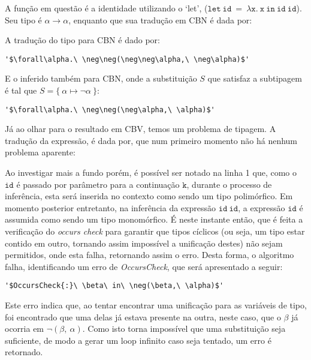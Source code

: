 A função em questão é a identidade utilizando o `let', ($\mathtt{let\ id\ =\ \lambda x.\ x\ in\ id\ id}$).
Seu tipo é $\alpha \to \alpha$, enquanto que sua tradução em CBN é dada por:

A tradução do tipo para CBN é dado por:
\lstset{extendedchars=false, escapeinside=''}
\begin{lstlisting}[style=output,caption={Tradução em CBN da identidade com `let'}]
  '$\forall\alpha.\ \neg\neg(\neg\neg\alpha,\ \neg\alpha)$'
\end{lstlisting}
E o inferido também para CBN, onde a substituição $S$ que satisfaz a subtipagem é tal que $S = \{\ \alpha \mapsto \neg\alpha \ \}$:
\lstset{extendedchars=false, escapeinside=''}
\begin{lstlisting}[style=output,caption={Inferência da identidade com `let' traduzido em CBN}]
  '$\forall\alpha.\ \neg\neg(\neg\alpha,\ \alpha)$'
\end{lstlisting}
Já ao olhar para o resultado em CBV, temos um problema de tipagem.
A tradução da expressão, é dada por, que num primeiro momento não há nenhum problema aparente:

Ao investigar mais a fundo porém, é possível ser notado na linha 1 que, como o $\mathtt{id}$ é passado por parâmetro para a continuação $\mathtt{k}$, durante o processo de inferência, esta será inserida no contexto como sendo um tipo polimórfico.
Em momento posterior entretanto, na inferência da expressão $\mathtt{id\ id}$, a expressão $\mathtt{id}$ é assumida como sendo um tipo monomórfico.
É neste instante então, que é feita a verificação do \textit{occurs check} para garantir que tipos cíclicos (ou seja, um tipo estar contido em outro, tornando assim impossível a unificação destes) não sejam permitidos, onde esta falha, retornando assim o erro.
Desta forma, o algoritmo falha, identificando um erro de \textit{OccursCheck}, que será apresentado a seguir:
\lstset{extendedchars=false, escapeinside=''}
\begin{lstlisting}[style=output,caption={Erro de Inferência da identidade com `let' traduzido em CBV}]
  '$OccursCheck{:}\ \beta\ in\ \neg(\beta,\ \alpha)$'
\end{lstlisting}
Este erro indica que, ao tentar encontrar uma unificação para as variáveis de tipo, foi encontrado que uma delas já estava presente na outra, neste caso, que o $\beta$ já ocorria em $\neg(\beta,\ \alpha)$.
Como isto torna impossível que uma substituição seja suficiente, de modo a gerar um loop infinito caso seja tentado, um erro é retornado.

